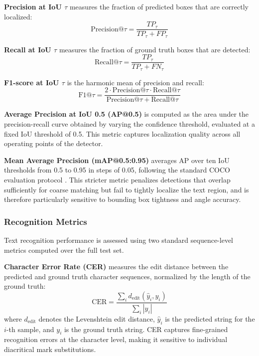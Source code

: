 \textbf{Precision at IoU $\tau$} measures the fraction of predicted boxes that are correctly localized:
\begin{equation}
\text{Precision}@\tau = \frac{TP_\tau}{TP_\tau + FP_\tau}
\end{equation}

\textbf{Recall at IoU $\tau$} measures the fraction of ground truth boxes that are detected:
\begin{equation}
\text{Recall}@\tau = \frac{TP_\tau}{TP_\tau + FN_\tau}
\end{equation}

\textbf{F1-score at IoU $\tau$} is the harmonic mean of precision and recall:
\begin{equation}
\text{F1}@\tau = \frac{2 \cdot \text{Precision}@\tau \cdot \text{Recall}@\tau}{\text{Precision}@\tau + \text{Recall}@\tau}
\end{equation}

\textbf{Average Precision at IoU 0.5 (AP@0.5)} is computed as the area under the precision-recall curve obtained by varying the confidence threshold, evaluated at a fixed IoU threshold of 0.5. This metric captures localization quality across all operating points of the detector.

\textbf{Mean Average Precision (mAP@0.5:0.95)} averages AP over ten IoU thresholds from 0.5 to 0.95 in steps of 0.05, following the standard COCO evaluation protocol \cite{Lin2015}. This stricter metric penalizes detections that overlap sufficiently for coarse matching but fail to tightly localize the text region, and is therefore particularly sensitive to bounding box tightness and angle accuracy.

\subsubsection{Recognition Metrics}

Text recognition performance is assessed using two standard sequence-level metrics computed over the full test set.

\textbf{Character Error Rate (CER)} measures the edit distance between the predicted and ground truth character sequences, normalized by the length of the ground truth:
\begin{equation}
\text{CER} = \frac{\sum_i d_{\text{edit}}(\hat{y}_i, y_i)}{\sum_i |y_i|}
\end{equation}
where $d_{\text{edit}}$ denotes the Levenshtein edit distance, $\hat{y}_i$ is the predicted string for the $i$-th sample, and $y_i$ is the ground truth string. CER captures fine-grained recognition errors at the character level, making it sensitive to individual diacritical mark substitutions.

